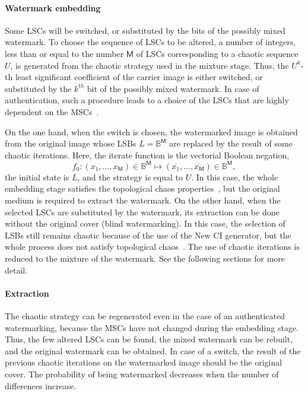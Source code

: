\documentclass[journal]{IEEEtran}
\begin{document}
\paragraph{Watermark embedding}

Some LSCs will be switched, or substituted by the bits of the possibly mixed watermark. To choose the sequence of LSCs to be altered, a number of integers, less than or equal to the number $\mathsf{M}$ of LSCs corresponding to a chaotic sequence $U$, is generated from the chaotic strategy used in the mixture stage. Thus, the $U^{k}$-th least significant coefficient of the carrier image is either switched, or substituted by the $k^{th}$ bit of the possibly mixed watermark. In case of authentication, such a procedure leads to a choice of the LSCs that are highly dependent on the MSCs~\cite{guyeux10}.

On the one hand, when the switch is chosen, the watermarked image is obtained from the original image whose LSBs $L = \mathds{B}^{\mathsf{M}}$ are replaced by the result of some chaotic iterations. Here, the iterate function is the vectorial Boolean negation,
\begin{equation}
f_0:(x_1,...,x_\mathsf{M}) \in \mathds{B}^\mathsf{M} \longmapsto (\overline{x_1},...,\overline{x_\mathsf{M}}) \in \mathds{B}^\mathsf{M},
\end{equation}
the initial state is $L$, and the strategy is equal to $U$. In this case, the whole embedding stage satisfies the topological chaos properties~\cite{guyeux10}, but the original medium is required to extract the watermark. On the other hand, when the selected LSCs are substituted by the watermark, its extraction can be done without the original cover (blind watermarking). In this case, the selection of LSBs still remains chaotic because of the use of the New CI generator, but the whole process does not satisfy topological chaos~\cite{guyeux10}. The use of chaotic iterations is reduced to the mixture of the watermark. See the following sections for more detail.

\paragraph{Extraction}

The chaotic strategy can be regenerated even in the case of an authenticated watermarking, because the MSCs have not changed during the embedding stage. Thus, the few altered LSCs can be found, the mixed watermark can be rebuilt, and the original watermark can be obtained. In case of a switch, the result of the previous chaotic iterations on the watermarked image should be the original cover. The probability of being watermarked decreases when the number of differences increase.
\end{document}
